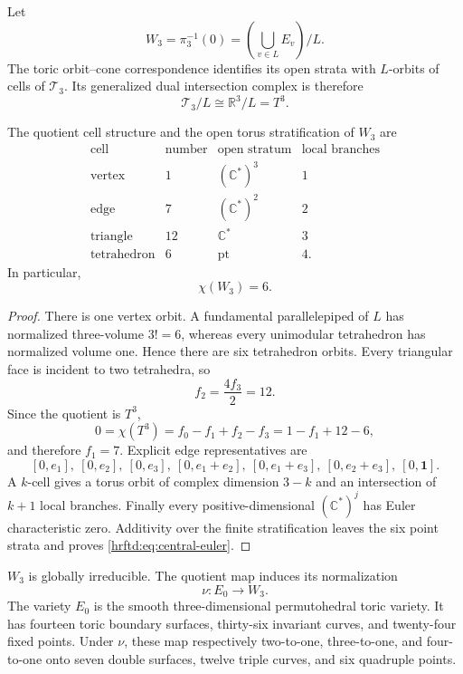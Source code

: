 Let
\begin{equation}
 W_3=\pi_3^{-1}(0)
 =
 \left(\bigcup_{v\in L}E_v\right)/L.
 \label{hrftd:eq:central-fibre}
\end{equation}
The toric orbit--cone correspondence identifies its open strata with
\(L\)-orbits of cells of \(\mathcal T_3\).  Its generalized dual
intersection complex is therefore
\begin{equation}
 \mathcal T_3/L\cong\mathbb R^3/L=T^3.
 \label{hrftd:eq:dual-torus-three}
\end{equation}

\begin{theorem}
\label{hrftd:thm:strata}
The quotient cell structure and the open torus stratification of \(W_3\)
are
\[
\begin{array}{c|c|c|c}
\text{cell}&\text{number}&\text{open stratum}&
\text{local branches}\\ \hline
\text{vertex}&1&(\mathbb C^*)^3&1\\
\text{edge}&7&(\mathbb C^*)^2&2\\
\text{triangle}&12&\mathbb C^*&3\\
\text{tetrahedron}&6&\mathrm{pt}&4.
\end{array}
\]
In particular,
\begin{equation}
 \chi(W_3)=6.
 \label{hrftd:eq:central-euler}
\end{equation}
\end{theorem}

\begin{proof}
There is one vertex orbit.  A fundamental parallelepiped of \(L\) has
normalized three-volume \(3!=6\), whereas every unimodular tetrahedron has
normalized volume one.  Hence there are six tetrahedron orbits.  Every
triangular face is incident to two tetrahedra, so
\[
 f_2=\frac{4f_3}{2}=12.
\]
Since the quotient is \(T^3\),
\[
 0=\chi(T^3)=f_0-f_1+f_2-f_3=1-f_1+12-6,
\]
and therefore \(f_1=7\).  Explicit edge representatives are
\[
 [0,e_1],\ [0,e_2],\ [0,e_3],\
 [0,e_1+e_2],\ [0,e_1+e_3],\
 [0,e_2+e_3],\ [0,\mathbf1].
\]
A \(k\)-cell gives a torus orbit of complex dimension \(3-k\) and an
intersection of \(k+1\) local branches.  Finally every
positive-dimensional \((\mathbb C^*)^j\) has Euler characteristic zero.
Additivity over the finite stratification leaves the six point strata and
proves \eqref{hrftd:eq:central-euler}.
\end{proof}

\begin{theorem}[Normalization]
\label{hrftd:thm:normalization}
\(W_3\) is globally irreducible.  The quotient map induces its normalization
\[
 \nu:E_0\longrightarrow W_3.
\]
The variety \(E_0\) is the smooth three-dimensional permutohedral toric
variety.  It has fourteen toric boundary surfaces, thirty-six invariant
curves, and twenty-four fixed points.  Under \(\nu\), these map respectively
two-to-one, three-to-one, and four-to-one onto seven double surfaces, twelve
triple curves, and six quadruple points.
\end{theorem}


